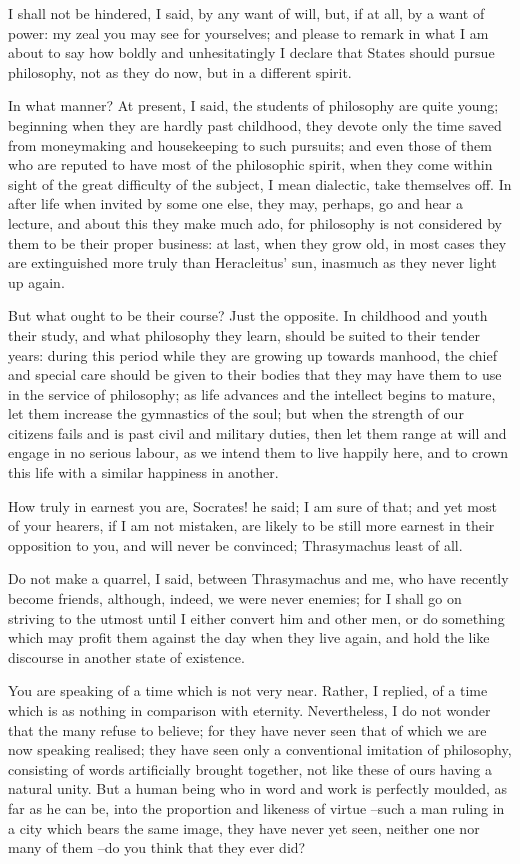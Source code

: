 I shall not be hindered, I said, by any want of will, but, if at all, by a want of power: my zeal you may see for yourselves; and please to remark in what I am about to say how boldly and unhesitatingly I declare that States should pursue philosophy, not as they do now, but in a different spirit.

In what manner?
At present, I said, the students of philosophy are quite young; beginning when they are hardly past childhood, they devote only the time saved from moneymaking and housekeeping to such pursuits; and even those of them who are reputed to have most of the philosophic spirit, when they come within sight of the great difficulty of the subject, I mean dialectic, take themselves off. In after life when invited by some one else, they may, perhaps, go and hear a lecture, and about this they make much ado, for philosophy is not considered by them to be their proper business: at last, when they grow old, in most cases they are extinguished more truly than Heracleitus' sun, inasmuch as they never light up again.

But what ought to be their course?
Just the opposite. In childhood and youth their study, and what philosophy they learn, should be suited to their tender years: during this period while they are growing up towards manhood, the chief and special care should be given to their bodies that they may have them to use in the service of philosophy; as life advances and the intellect begins to mature, let them increase the gymnastics of the soul; but when the strength of our citizens fails and is past civil and military duties, then let them range at will and engage in no serious labour, as we intend them to live happily here, and to crown this life with a similar happiness in another.

How truly in earnest you are, Socrates! he said; I am sure of that; and yet most of your hearers, if I am not mistaken, are likely to be still more earnest in their opposition to you, and will never be convinced; Thrasymachus least of all.

Do not make a quarrel, I said, between Thrasymachus and me, who have recently become friends, although, indeed, we were never enemies; for I shall go on striving to the utmost until I either convert him and other men, or do something which may profit them against the day when they live again, and hold the like discourse in another state of existence.

You are speaking of a time which is not very near.
Rather, I replied, of a time which is as nothing in comparison with eternity. Nevertheless, I do not wonder that the many refuse to believe; for they have never seen that of which we are now speaking realised; they have seen only a conventional imitation of philosophy, consisting of words artificially brought together, not like these of ours having a natural unity. But a human being who in word and work is perfectly moulded, as far as he can be, into the proportion and likeness of virtue --such a man ruling in a city which bears the same image, they have never yet seen, neither one nor many of them --do you think that they ever did?

